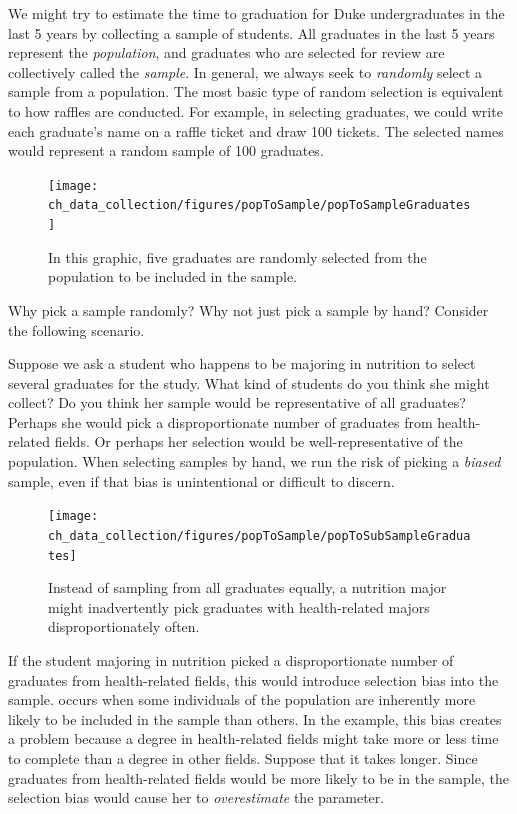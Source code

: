 
We might try to estimate the time to graduation for Duke undergraduates in the last 5 years by collecting a sample of students. All graduates in the last 5 years represent the \emph{population}, and graduates who are selected for review are collectively called the \emph{sample}. In general, we always seek to \emph{randomly} select a sample from a population. The most basic type of random selection is equivalent to how raffles are conducted. For example, in selecting graduates, we could write each graduate's name on a raffle ticket and draw 100 tickets. The selected names would represent a random sample of 100 graduates.

\begin{figure}[ht]
\centering
\texttt{[image: ch\_data\_collection/figures/popToSample/popToSampleGraduates]}
\caption{In this graphic, five graduates are randomly selected from the population to be included in the sample.}
\label{popToSampleGraduates}
\end{figure}

Why pick a sample randomly? Why not just pick a sample by hand? Consider the following scenario.

\begin{example}{Suppose we ask a student who happens to be majoring in nutrition to select several graduates for the study. What kind of students do you think she might collect? Do you think her sample would be representative of all graduates?}
Perhaps she would pick a disproportionate number of graduates from health-related fields. Or perhaps her selection would be well-representative of the population. When selecting samples by hand, we run the risk of picking a \emph{biased} sample, even if that bias is unintentional or difficult to discern.
\end{example}

\begin{figure}
\centering
\texttt{[image: ch\_data\_collection/figures/popToSample/popToSubSampleGraduates]}
\caption{Instead of sampling from all graduates equally, a nutrition major might inadvertently pick graduates with health-related majors disproportionately often.}
\label{popToSubSampleGraduates}
\end{figure}

If the student majoring in nutrition picked a disproportionate number of graduates from health-related fields, this would introduce selection bias into the sample.  occurs when some individuals of the population are inherently more likely to be included in the sample than others. In the example, this bias creates a problem because a degree in health-related fields might take more or less time to complete than a degree in other fields. Suppose that it takes longer. Since graduates from health-related fields would be more likely to be in the sample, the selection bias would cause her to \emph{overestimate} the parameter.

